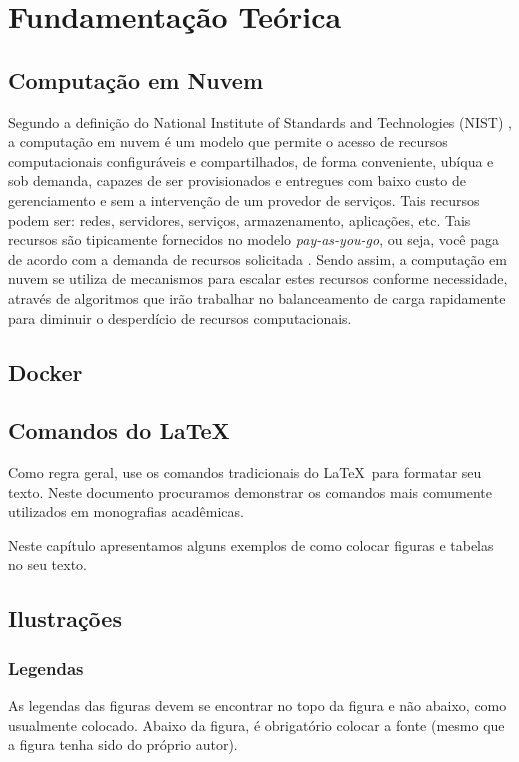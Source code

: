 \documentclass[twoside,english,brazilian]{UNISINOSmonografia}
\begin{document}
\chapter{Fundamentação Teórica}

\section{Computação em Nuvem}
Segundo a definição do National Institute of Standards and Technologies (NIST) \cite{Mell2012}, a computação em nuvem é um modelo que permite o acesso de recursos computacionais configuráveis e compartilhados, de forma conveniente, ubíqua e sob demanda, capazes de ser provisionados e entregues com baixo custo de gerenciamento e sem a intervenção de um provedor de serviços. Tais recursos podem ser: redes, servidores, serviços, armazenamento, aplicações, etc. Tais recursos são tipicamente fornecidos no modelo \textit{pay-as-you-go}, ou seja, você paga de acordo com a demanda de recursos solicitada \cite{Suleiman2012}. Sendo assim, a computação em nuvem se utiliza de mecanismos para escalar estes recursos conforme necessidade, através de algoritmos que irão trabalhar no balanceamento de carga rapidamente para diminuir o desperdício de recursos computacionais.

\section{Docker}



\section{Comandos do \LaTeX}
Como regra geral, use os comandos tradicionais do \LaTeX\ para formatar seu texto.  Neste documento procuramos demonstrar os comandos mais comumente utilizados em monografias acadêmicas.

Neste capítulo apresentamos alguns exemplos de como colocar figuras e tabelas no seu texto.

\section{Ilustrações}

\subsection{Legendas}
As legendas das figuras devem se encontrar no topo da figura e não abaixo, como usualmente colocado. Abaixo da figura, é obrigatório colocar a fonte (mesmo que a figura tenha sido do próprio autor).
\end{document}
